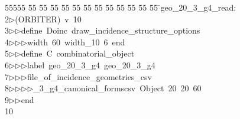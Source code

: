 %
%
\begin{tabbing}
55555 \= 55 \= 55 \= 55 \= 55 \= 55 \= 55 \= 55 \= 55 \= 55 \= 55 \= 55 \= 55 \= \>geo\_20\_3\_g4\_read:\\[0pt]
2\>$\triangleright$\>(ORBITER)\ v\ 10\ \\[0pt]
3\>$\triangleright$\>$\triangleright$\>define\ Doinc\ draw\_incidence\_structure\_options\ \\[0pt]
4\>$\triangleright$\>$\triangleright$\>$\triangleright$\>width\ 60\ width\_10\ 6\ end\ \\[0pt]
5\>$\triangleright$\>$\triangleright$\>define\ C\ combinatorial\_object\ \\[0pt]
6\>$\triangleright$\>$\triangleright$\>$\triangleright$\>label\ geo\_20\_3\_g4\ geo\_20\_3\_g4\ \\[0pt]
7\>$\triangleright$\>$\triangleright$\>$\triangleright$\>file\_of\_incidence\_geometries\_csv\ \\[0pt]
8\>$\triangleright$\>$\triangleright$\>$\triangleright$\>$\triangleright$\_3\_g4\_canonical\_formscsv\ Object\ 20\ 20\ 60\ \\[0pt]
9\>$\triangleright$\>$\triangleright$\>end\\[0pt]
10\>\end{tabbing}
